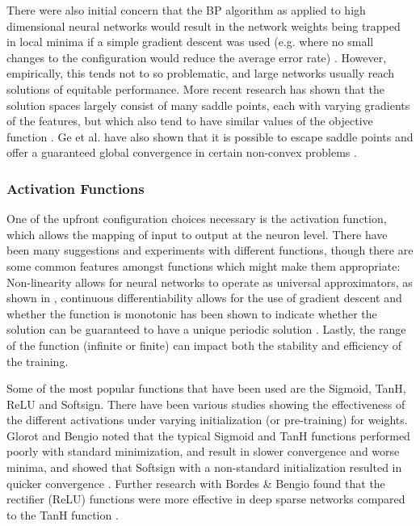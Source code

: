 \documentclass[a4paper,11pt,oneside]{article}
\theoremstyle{plain}
\theoremstyle{definition}
\begin{document}
There were also initial concern that the BP algorithm as applied to high dimensional neural networks would result 
in the network weights being trapped in local minima if a simple gradient descent was used (e.g. where no small 
changes to the configuration would reduce the average error rate) \cite{LeCun4}. 
However, empirically, this tends not to so problematic, and large networks usually reach solutions of equitable 
performance. More recent research has shown that the solution spaces largely consist of many saddle points, each 
with varying gradients of the features, but which also tend to have similar values of the objective function \cite{Dauphin}. 
Ge et al. have also shown that it is possible to escape saddle points and offer a guaranteed global convergence 
in certain non-convex problems \cite{Ge}.
\hfill \break 

\subsubsection{Activation Functions}\label{lr_activationfunctions}

One of the upfront configuration choices necessary is the activation function, which allows the mapping of input 
to output at the neuron level. There have been many suggestions and experiments with different functions, though 
there are some common features amongst functions which might make them appropriate: Non-linearity allows for 
neural networks to operate as universal approximators, as shown in \cite{Hornik}, continuous differentiability allows for the 
use of gradient descent and whether the function is monotonic has been shown to indicate whether the solution 
can be guaranteed to have a unique periodic solution \cite{Wu}. Lastly, the range of the function (infinite or finite) can impact both the 
stability and efficiency of the training.
\hfill \break 

Some of the most popular functions that have been used are the Sigmoid, TanH, ReLU and Softsign. There have 
been various studies showing the effectiveness of the different activations under varying initialization (or pre-training) 
for weights. Glorot and Bengio noted that the typical Sigmoid and TanH functions performed poorly with standard 
minimization, and result in slower convergence and worse minima, and showed that Softsign with a non-standard 
initialization resulted in quicker convergence \cite{Glorot}. Further research with Bordes \& Bengio found that the 
rectifier (ReLU) functions were  more effective in deep sparse networks compared to the TanH function \cite{Glorot2}.
\end{document}
